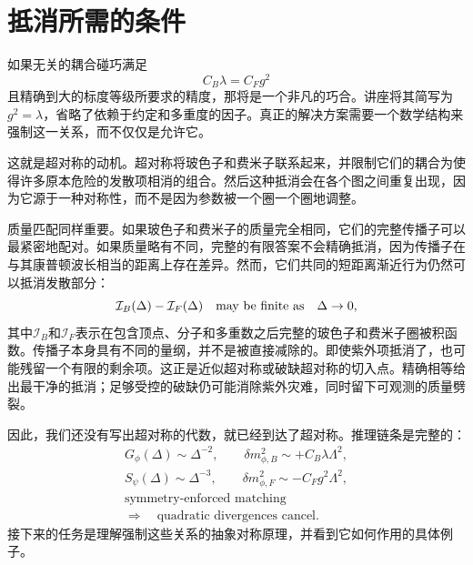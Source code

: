 \section{抵消所需的条件}

如果无关的耦合碰巧满足
\begin{equation}
C_B\lambda=C_Fg^2
\end{equation}
且精确到大的标度等级所要求的精度，那将是一个非凡的巧合。讲座将其简写为\(g^2=\lambda\)，省略了依赖于约定和多重度的因子。真正的解决方案需要一个数学结构来强制这一关系，而不仅仅是允许它。

这就是超对称的动机。超对称将玻色子和费米子联系起来，并限制它们的耦合为使得许多原本危险的发散项相消的组合。然后这种抵消会在各个图之间重复出现，因为它源于一种对称性，而不是因为参数被一个圈一个圈地调整。

质量匹配同样重要。如果玻色子和费米子的质量完全相同，它们的完整传播子可以最紧密地配对。如果质量略有不同，完整的有限答案不会精确抵消，因为传播子在与其康普顿波长相当的距离上存在差异。然而，它们共同的短距离渐近行为仍然可以抵消发散部分：
\begin{equation}
\mathcal I_B(\Delta)-\mathcal I_F(\Delta)
\quad\hbox{may be finite as}\quad \Delta\to0,
\end{equation}
其中\(\mathcal I_B\)和\(\mathcal I_F\)表示在包含顶点、分子和多重数之后完整的玻色子和费米子圈被积函数。传播子本身具有不同的量纲，并不是被直接减除的。即使紫外项抵消了，也可能残留一个有限的剩余项。这正是近似超对称或破缺超对称的切入点。精确相等给出最干净的抵消；足够受控的破缺仍可能消除紫外灾难，同时留下可观测的质量劈裂。

因此，我们还没有写出超对称的代数，就已经到达了超对称。推理链条是完整的：
\begin{equation}
\begin{gathered}
G_\phi(\Delta)\sim \Delta^{-2},
\qquad
\delta m_{\phi,B}^2\sim+C_B\lambda\Lambda^2,\\[0.4em]
S_\psi(\Delta)\sim \Delta^{-3},
\qquad
\delta m_{\phi,F}^2\sim-C_Fg^2\Lambda^2,\\[0.4em]
\text{symmetry-enforced matching}\\
\Longrightarrow\quad
\text{quadratic divergences cancel}.
\end{gathered}
\end{equation}
接下来的任务是理解强制这些关系的抽象对称原理，并看到它如何作用的具体例子。